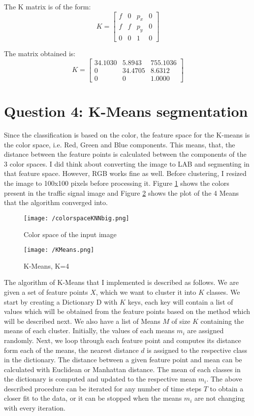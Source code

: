 \documentclass[a4paper, 10pt]{article}
\begin{document}
\begin{multicols}{2}
		The K matrix is of the form:
		\[
		K = \begin{bmatrix}
		f & 0 & p_{x} & 0 \\
		f & f & p_{y} & 0 \\
		0 & 0 & 1 & 0
		\end{bmatrix}
		\]
		
		The matrix obtained is:
		\[
		K =
		\begin{bmatrix}
		34.1030  &  5.8943 & 755.1036 \\
		0  & 34.4705  &  8.6312 \\
		0  &       0  &  1.0000
		\end{bmatrix}
		\]
	
	\section{Question 4: K-Means segmentation}
	
	Since the classification is based on the color, the feature space for the K-means is the color space, i.e. Red, Green and Blue components. This means, that, the distance between the feature points is calculated between the components of the 3 color spaces. I did think about converting the image to LAB and segmenting in that feature space. However, RGB works fine as well. Before clustering, I resized the image to 100x100 pixels before processing it. Figure \ref{fig:colorspace} shows the colors present in the traffic signal image and Figure \ref{fig:kmeans} shows the plot of the 4 Means that the algorithm converged into.
	
	\begin{figure}[H]
	\centering
	\texttt{[image: /colorspaceKNNbig.png]}
	\caption{Color space of the input image}
	\label{fig:colorspace}
	\end{figure}
	
	\begin{figure}[H]
	\centering
	\texttt{[image: /KMeans.png]}
	\caption{K-Means, K=4}
	\label{fig:kmeans}
	\end{figure}		
	
	The algorithm of K-Means that I implemented is described as follows. We are given a set of feature points $X$, which we want to cluster it into $K$ classes. We start by creating a Dictionary D with $K$ keys, each key will contain a list of values which will be obtained from the feature points based on the method which will be described next. We also have a list of Means $M$ of size $K$ containing the means of each cluster. Initially, the values of each means $m_{i}$ are assigned randomly. Next, we loop through each feature point and computes its distance form each of the means, the nearest distance $d$ is assigned to the respective class in the dictionary. The distance between a given feature point and mean can be calculated with Euclidean or Manhattan distance. The mean of each classes in the dictionary is computed and updated to the respective mean $m_{i}$. The above described procedure can be iterated for any number of time steps $T$ to obtain a closer fit to the data, or it can be stopped when the means $m_{i}$ are not changing with every iteration.
	

\end{multicols}
\end{document}
